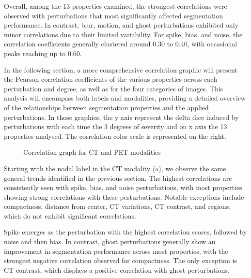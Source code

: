Overall, among the 13 properties examined, the strongest correlations were observed with perturbations that most significantly affected segmentation performance. In contrast, blur, motion, and ghost perturbations exhibited only minor correlations due to their limited variability. For spike, bias, and noise, the correlation coefficients generally clustered around 0.30 to 0.40, with occasional peaks reaching up to 0.60.

In the following section, a more comprehensive correlation graphic will present the Pearson correlation coefficients of the various properties across each perturbation and degree, as well as for the four categories of images. This analysis will encompass both labels and modalities, providing a detailed overview of the relationships between segmentation properties and the applied perturbations.
\newpage
In those graphics, the y axis represent the delta dice induced by perturbations with each time the 3 degrees of severity and on x axis the 13 properties analysed.
The correlation color scale is represented on the right.
\begin{figure}[ht]
    \centering
    \hfill
    \hfill
    \vfill
    \hfill
    \hfill
    \caption{Correlation graph for CT and PET modalities}
    \label{fig:four_subfigures}
\end{figure}
\newpage
Starting with the nodal label in the CT modality (a), we observe the same general trends identified in the previous section. The highest correlations are consistently seen with spike, bias, and noise perturbations, with most properties showing strong correlations with these perturbations. Notable exceptions include compactness, distance from center, CT variations, CT contrast, and regions, which do not exhibit significant correlations.

Spike emerges as the perturbation with the highest correlation scores, followed by noise and then bias. In contrast, ghost perturbations generally show an improvement in segmentation performance across most properties, with the strongest negative correlation observed for compactness. The only exception is CT contrast, which displays a positive correlation with ghost perturbations.

